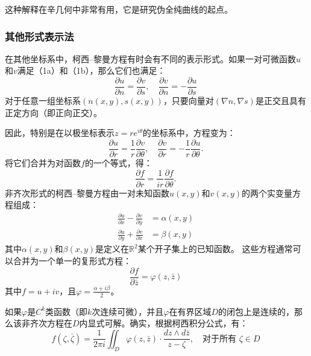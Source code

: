这种解释在辛几何中非常有用，它是研究伪全纯曲线的起点。
\subsubsection{其他形式表示法}  
在其他坐标系中，柯西–黎曼方程有时会有不同的表示形式。如果一对可微函数\( u \)和\( v \)满足（1a）和（1b），那么它们也满足：
\[
\frac{\partial u}{\partial n} = \frac{\partial v}{\partial s}, \quad \frac{\partial v}{\partial n} = -\frac{\partial u}{\partial s}~
\]
对于任意一组坐标系\( (n(x, y), s(x, y)) \)，只要向量对\( (\nabla n, \nabla s) \)是正交且具有正定方向（即正向正交）。  

因此，特别是在以极坐标表示\( z = re^{i\theta} \)的坐标系中，方程变为：
\[
\frac{\partial u}{\partial r} = \frac{1}{r} \frac{\partial v}{\partial \theta}, \quad \frac{\partial v}{\partial r} = -\frac{1}{r} \frac{\partial u}{\partial \theta}.~
\]
将它们合并为对函数\( f \)的一个等式，得：
\[
\frac{\partial f}{\partial r} = \frac{1}{ir} \frac{\partial f}{\partial \theta}.~
\]
非齐次形式的柯西–黎曼方程由一对未知函数\( u(x, y) \)和\( v(x, y) \)的两个实变量方程组成：
\[
\begin{aligned}
\frac{\partial u}{\partial x} - \frac{\partial v}{\partial y} &= \alpha(x, y) \\
\frac{\partial u}{\partial y} + \frac{\partial v}{\partial x} &= \beta(x, y)
\end{aligned}~
\]
其中\( \alpha(x, y) \)和\( \beta(x, y) \)是定义在\( \mathbb{R}^2 \)某个开子集上的已知函数。  
这些方程通常可以合并为一个单一的复形式方程：
\[
\frac{\partial f}{\partial \bar{z}} = \varphi(z, \bar{z})~
\]
其中\( f = u + iv \)，且\( \varphi = \frac{\alpha + i\beta}{2} \)。

如果\( \varphi \)是\( C^k \)类函数（即\( k \)次连续可微），并且\( \varphi \)在有界区域\( D \)的闭包上是连续的，那么该非齐次方程在\( D \)内显式可解。确实，根据柯西积分公式，有：
\[
f(\zeta, \bar{\zeta}) = \frac{1}{2\pi i} \iint_D \varphi(z, \bar{z}) \cdot \frac{dz \wedge d\bar{z}}{z - \zeta}, \quad \text{对于所有 } \zeta \in D~
\]